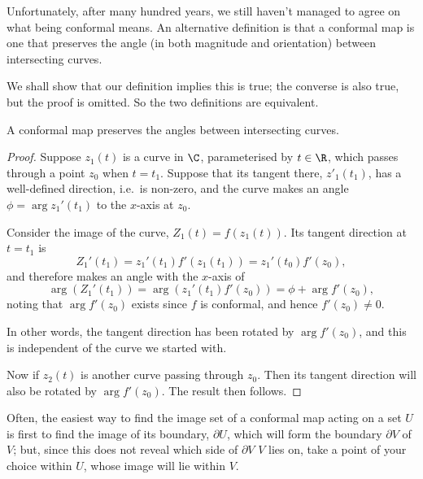 \documentclass[a4paper]{article}
\begin{document}
Unfortunately, after many hundred years, we still haven't managed to agree on what being conformal means. An alternative definition is that a conformal map is one that preserves the angle (in both magnitude and orientation) between intersecting curves.

We shall show that our definition implies this is true; the converse is also true, but the proof is omitted. So the two definitions are equivalent.

\begin{prop}
  A conformal map preserves the angles between intersecting curves.
\end{prop}

\begin{proof}
  Suppose $z_1(t)$ is a curve in $\C$, parameterised by $t \in \R$, which passes through a point $z_0$ when $t = t_1$. Suppose that its tangent there, $z'_1(t_1)$, has a well-defined direction, i.e.\ is non-zero, and the curve makes an angle $\phi = \arg z_1'(t_1)$ to the $x$-axis at $z_0$.

  Consider the image of the curve, $Z_1(t) = f(z_1(t))$. Its tangent direction at $t = t_1$ is
  \[
    Z_1'(t_1) = z_1'(t_1) f'(z_1(t_1)) = z_1'(t_0) f'(z_0),
  \]
  and therefore makes an angle with the $x$-axis of
  \[
    \arg (Z_1'(t_1)) = \arg(z_1'(t_1) f'(z_0)) = \phi + \arg f'(z_0),
  \]
  noting that $\arg f'(z_0)$ exists since $f$ is conformal, and hence $f'(z_0) \not= 0$.

  In other words, the tangent direction has been rotated by $\arg f'(z_0)$, and this is independent of the curve we started with.

  Now if $z_2(t)$ is another curve passing through $z_0$. Then its tangent direction will also be rotated by $\arg f'(z_0)$. The result then follows.
\end{proof}

Often, the easiest way to find the image set of a conformal map acting on a set $U$ is first to find the image of its boundary, $\partial U$, which will form the boundary $\partial V$ of $V$; but, since this does not reveal which side of $\partial V$ $V$ lies on, take a point of your choice within $U$, whose image will lie within $V$.
\end{document}
